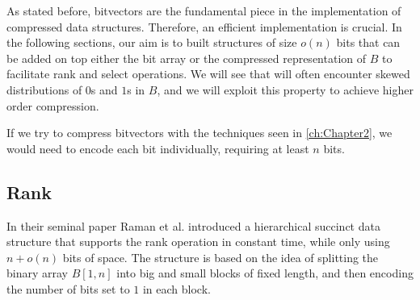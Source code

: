 \begin{example}

\end{example}
 \vspace{0.4cm}

\noindent As stated before, bitvectors are the fundamental piece in the implementation of compressed data structures. Therefore, an efficient implementation is crucial. In the following sections, our aim is to built structures of size $o(n)$ bits that can be added on top either the bit array or the compressed representation of $B$ to facilitate rank and select operations. We will see that will often encounter skewed distributions of $0$s and $1$s in $B$, and we will exploit this property to achieve higher order compression.

\begin{remark}
    If we try to compress bitvectors with the techniques seen in \autoref{ch:Chapter2}, we would need to encode each bit individually, requiring at least $n$ bits.
\end{remark}


\subsection{Rank}

In their seminal paper \cite{RRR2002} Raman et al. introduced a hierarchical succinct data structure that supports the rank operation in constant time, while only using  $n + o(n)$  bits of space. The structure is based on the idea of splitting the binary array $B[1, n]$ into big and small blocks of fixed length, and then encoding the number of bits set to $1$ in each block. \vspace{0.4cm}


